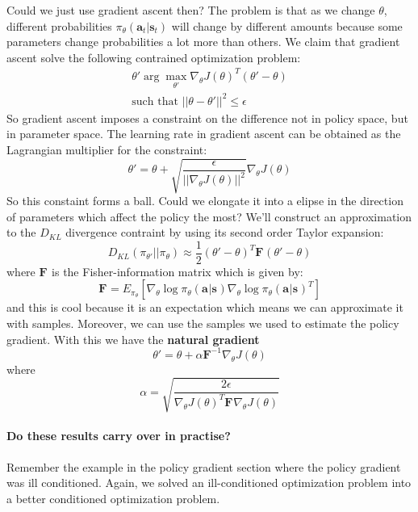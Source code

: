 \documentclass{report}
\newcommand{\argmax}{\arg\!\max}
\begin{document}
Could we just use gradient ascent then?
The problem is that as we change $ \theta  $,
different probabilities $ \pi_{ \theta }(\bm{a}_{t}| \bm{s}_{t} )  $ will change 
by different amounts because some parameters change probabilities a lot more
than others.
We claim that gradient ascent solve the following contrained
optimization problem:
\begin{gather}
\theta' \argmax_{\theta'} \nabla_{ \theta } J (\theta)^{ T } (\theta' - \theta) \\
\text{such that } ||\theta - \theta'||^{ 2 } \leq \epsilon
\end{gather}
So gradient ascent imposes a constraint on the difference not in policy space,
but in parameter space.
The learning rate in gradient ascent can be obtained as the Lagrangian multiplier
for the constraint:
\begin{equation}
		\theta' = \theta + \sqrt{\frac{\epsilon}{||\nabla_{ \theta } J(\theta)||^{ 2 }} } \nabla_{ \theta } J (\theta) 
\end{equation}
So this constaint forms a ball.
Could we elongate it into a elipse in the direction 
of parameters which affect the policy the most?
We'll construct an approximation to the $ D_{ KL }  $ divergence contraint by using its
second order Taylor expansion:
\begin{equation}
		D_{ KL } (\pi_{ \theta' } || \pi_{ \theta })
		\approx \frac{1}{2} (\theta' -\theta)^{ T } \bm{F}_{} (\theta' -\theta)
\end{equation}
where $ \bm{F}_{}  $ is the Fisher-information matrix which is given by:
\begin{equation}
		\bm{F}_{} = E_{ \pi_{ \theta } } \left[ 
		\nabla_{ \theta } \log 
		\pi_{ \theta } (\bm{a}_{}| \bm{s}_{} ) \nabla_{ \theta } \log \pi_{ \theta } (\bm{a}_{}| \bm{s}_{} )^{ T }
\right] 
\end{equation}
and this is cool because it is an expectation which means we can approximate it with samples.
Moreover, we can use the samples we used to estimate the policy gradient.
With this we have the \textbf{natural gradient}
\begin{equation}
		\theta' = \theta + \alpha \bm{F}_{}^{ -1 } \nabla_{ \theta } J (\theta)
\end{equation}
where
\begin{equation}
		\alpha = \sqrt{\frac{2\epsilon}{\nabla_{ \theta } J (\theta)^{ T } \bm{F}_{} \nabla_{ \theta } J (\theta)} }
\end{equation}

\paragraph{Do these results carry over in practise?}
Remember the example in the policy gradient section where the policy gradient was ill conditioned.
Again, we solved an ill-conditioned optimization problem into a better conditioned optimization problem.
\end{document}
